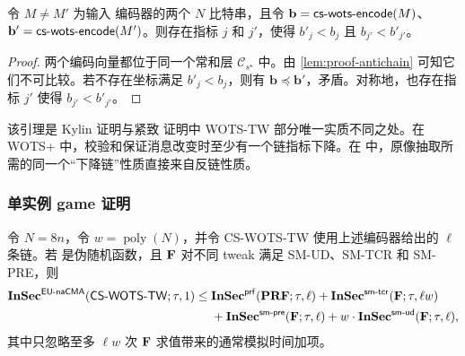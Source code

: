 \begin{lemma}
\label{lem:proof-cswots-direction}
令 $M\ne M'$ 为输入 \WOTSCS 编码器的两个 $N$ 比特串，且令 $\mathbf{b}=\mathsf{cs\text{-}wots\text{-}encode}(M)$、$\mathbf{b}'=\mathsf{cs\text{-}wots\text{-}encode}(M')$。则存在指标 $j$ 和 $j'$，使得 $b'_j<b_j$ 且 $b_{j'}<b'_{j'}$。
\end{lemma}

\begin{proof}
两个编码向量都位于同一个常和层 $\mathcal{C}_{s^\star}$ 中。由 \cref{lem:proof-antichain} 可知它们不可比较。若不存在坐标满足 $b'_j<b_j$，则有 $\mathbf{b}\preceq\mathbf{b}'$，矛盾。对称地，也存在指标 $j'$ 使得 $b_{j'}<b'_{j'}$。
\end{proof}

该引理是 Kylin 证明与紧致 \SPHINCSP 证明中 WOTS-TW 部分唯一实质不同之处。在 WOTS+ 中，校验和保证消息改变时至少有一个链指标下降。在 \WOTSCS 中，原像抽取所需的同一个“下降链”性质直接来自反链性质。

\subsubsection{单实例 game 证明}
\label{sec:proof-cswots-single}

\begin{theorem}
\label{thm:proof-cswots-single}
令 $N=8n$，令 $w=\operatorname{poly}(N)$，并令 CS-WOTS-TW 使用上述编码器给出的 $\ell$ 条链。若 \PRF 是伪随机函数，且 $\mathbf{F}$ 对不同 tweak 满足 SM-UD、SM-TCR 和 SM-PRE，则
\begin{align}
\mathbf{InSec}^{\mathsf{EU\text{-}naCMA}}(\mathsf{CS\text{-}WOTS\text{-}TW};\tau,1)
\le{}&
    \mathbf{InSec}^{\mathsf{prf}}(\mathbf{PRF};\tau,\ell)
    +\mathbf{InSec}^{\mathsf{sm\text{-}tcr}}(\mathbf{F};\tau,\ell w) \notag\\
&   +\mathbf{InSec}^{\mathsf{sm\text{-}pre}}(\mathbf{F};\tau,\ell)
    +w\cdot\mathbf{InSec}^{\mathsf{sm\text{-}ud}}(\mathbf{F};\tau,\ell),
\label{eq:proof-cswots-single}
\end{align}
其中只忽略至多 $\ell w$ 次 $\mathbf{F}$ 求值带来的通常模拟时间加项。
\end{theorem}

